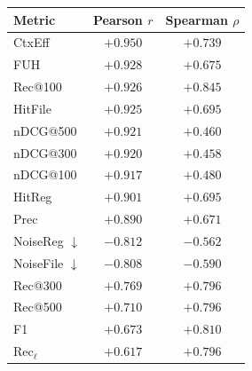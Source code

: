 \footnotesize
\renewcommand{\arraystretch}{1.12}
\setlength{\tabcolsep}{6pt}
\begin{tabular}{@{} l cc @{}}
  \toprule
  Metric & Pearson $r$ & Spearman $\rho$ \\
  \midrule
  CtxEff                 & $+0.950$ & $+0.739$ \\
  FUH                    & $+0.928$ & $+0.675$ \\
  Rec@100                & $+0.926$ & $+0.845$ \\
  HitFile                & $+0.925$ & $+0.695$ \\
  nDCG@500               & $+0.921$ & $+0.460$ \\
  nDCG@300               & $+0.920$ & $+0.458$ \\
  nDCG@100               & $+0.917$ & $+0.480$ \\
  HitReg                 & $+0.901$ & $+0.695$ \\
  Prec                   & $+0.890$ & $+0.671$ \\
  NoiseReg $\downarrow$  & $-0.812$ & $-0.562$ \\
  NoiseFile $\downarrow$ & $-0.808$ & $-0.590$ \\
  Rec@300                & $+0.769$ & $+0.796$ \\
  Rec@500                & $+0.710$ & $+0.796$ \\
  F1                     & $+0.673$ & $+0.810$ \\
  Rec$_\ell$             & $+0.617$ & $+0.796$ \\
  \bottomrule
\end{tabular}

